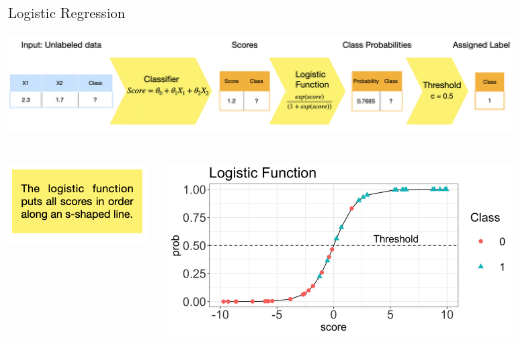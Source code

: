 \documentclass[11pt,compress,t,notes=noshow, xcolor=table]{beamer}
\begin{document}
\begin{vbframe}{Logistic Regression}
\begin{center}
  \includegraphics[width = 1\textwidth]{slides/supervised-classification/figure_man/nutshell-classif-logistic-regression.png}
\end{center}
\begin{columns}
\begin{column}{0.35\textwidth} 
\begin{center}
\includegraphics[width=\textwidth]{slides/supervised-classification/figure_man/nutshell-classification-text-box-logisticreg.png}
\end{center}
\end{column}
\begin{column}{0.6\textwidth} 
\begin{center}
  \includegraphics[width=1\textwidth]{slides/supervised-classification/figure/nutshell_classif_logistic_function.png}
\end{center}
\end{column}
\end{columns}



\end{vbframe}
\end{document}
